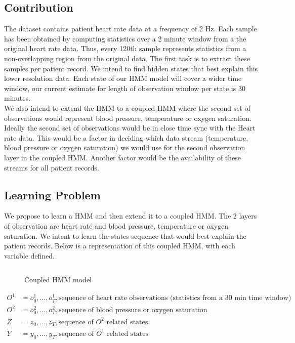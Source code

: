 \documentclass[12pt,solutions]{article}
\begin{document}
\subsection{Contribution}
The dataset contains patient heart rate data at a frequency of 2 Hz. Each sample has been obtained by computing statistics over a 2 minute window from a the original heart rate data. Thus, every 120th sample represents statistics from a non-overlapping region from the original data. The first task is to extract these samples per patient record. We intend to find hidden states that best explain this lower resolution data. Each state of our HMM model will cover a wider time window, our current estimate for length of observation window per state is 30 minutes.\\
We also intend to extend the HMM to a coupled HMM where the second set of observations would represent blood pressure, temperature or oxygen saturation. Ideally the second set of observations would be in close time sync with the Heart rate data. This would be a factor in deciding which data stream (temperature, blood pressure or oxygen saturation) we would use for the second observation layer in the coupled HMM. Another factor would be the availability of these streams for all patient records. \\
\subsection{Learning Problem}
We propose to learn a HMM and then extend it to a coupled HMM. The 2 layers of observation are heart rate and blood pressure, temperature or oxygen saturation.  We intent to learn the states sequence that would best explain the patient records. Below is a representation of this coupled HMM, with each variable defined.\\
\begin{figure}[ht]
  \begin{center}
    \begin{tabular}{cc}
      
    \end{tabular}
  \end{center}
  \caption{Coupled HMM model}
\label{fig:coupled_hmm_fig}
\end{figure}
\begin{align*}
O^1 &= o^1_{0}, \ldots,o^1_{T},   \text{sequence of heart rate observations (statistics from a 30 min time window)}\\
O^2 &=o^2_{0}, \ldots,o^2_{T},  \text{sequence of blood pressure or oxygen saturation}\\
Z &=  z_{0}, \ldots,z_{T}, \text{sequence of ${O^2}$ related states}\\
Y &=  y_{0}, \ldots,y_{T},  \text{sequence of ${O^1}$ related states}\\
\end{align*}
\end{document}
